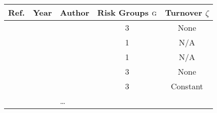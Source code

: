 \begin{tabular}{cllcc}
	\toprule
	         Ref.           & Year                        & Author                        & Risk Groups $\textsc{g}$ & Turnover $\zeta$ \\
	\midrule
	  \cite{Hallett2008}    & \citeyear{Hallett2008}      & \citeauthor{Hallett2008}      &        3         &       None       \\
	\cite{Barnighausen2012} & \citeyear{Barnighausen2012} & \citeauthor{Barnighausen2012} &        1         &       N/A        \\
	   \cite{Estill2012}    & \citeyear{Estill2012}       & \citeauthor{Estill2012}       &        1         &       N/A        \\
	   \cite{Cremin2013}    & \citeyear{Cremin2013}       & \citeauthor{Cremin2013}       &        3         &       None       \\
	   \cite{Eaton2014}     & \citeyear{Eaton2014}        & \citeauthor{Eaton2014}        &        3         &     Constant     \\
	                        &                             & \dots \\
	\bottomrule            
\end{tabular}
